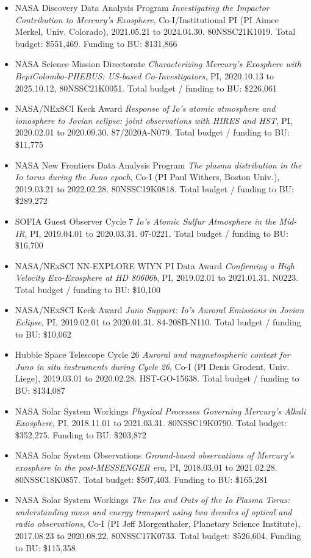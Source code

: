 \documentclass[12pt]{report}
\begin{document}
\begin{itemize}
 \item NASA Discovery Data Analysis Program {\it Investigating the Impactor Contribution to Mercury's Exosphere}, Co-I/Institutional PI (PI Aimee Merkel, Univ. Colorado), 2021.05.21 to 2024.04.30. 80NSSC21K1019. Total budget: \$551,469. Funding to BU: \$131,866
 \item NASA Science Mission Directorate {\it Characterizing Mercury’s Exosphere with BepiColombo-PHEBUS: US-based Co-Investigators}, PI, 2020.10.13 to 2025.10.12, 80NSSC21K0051. Total budget / funding to BU: \$226,061
 \item NASA/NExSCI Keck Award {\it Response of Io's atomic atmosphere and ionosphere to Jovian eclipse: joint observations with HIRES and HST}, PI, 2020.02.01 to 2020.09.30. 87/2020A-N079. Total budget / funding to BU: \$11,775
 \item NASA New Frontiers Data Analysis Program {\it The plasma distribution in the Io torus during the Juno epoch}, Co-I (PI Paul Withers, Boston Univ.), 2019.03.21 to 2022.02.28. 80NSSC19K0818. Total budget / funding to BU: \$289,272
 \item SOFIA Guest Observer Cycle 7 {\it Io's Atomic Sulfur Atmosphere in the Mid-IR}, PI, 2019.04.01 to 2020.03.31. 07-0221. Total budget / funding to BU: \$16,700
 \item NASA/NExSCI NN-EXPLORE WIYN PI Data Award {\it Confirming a High Velocity Exo-Exosphere at HD 80606b}, PI, 2019.02.01 to 2021.01.31. N0223. Total budget / funding to BU: \$10,100
 \item NASA/NExSCI Keck Award {\it Juno Support: Io's Auroral Emissions in Jovian Eclipse}, PI, 2019.02.01 to 2020.01.31. 84-208B-N110. Total budget / funding to BU: \$10,062
 \item Hubble Space Telescope Cycle 26 {\it Auroral and magnetospheric context for Juno in situ instruments during Cycle 26}, Co-I (PI Denis Grodent, Univ. Liege), 2019.03.01 to 2020.02.28. HST-GO-15638. Total budget / funding to BU: \$134,087
 \item NASA Solar System Workings  {\it Physical Processes Governing Mercury's Alkali Exosphere}, PI, 2018.11.01 to 2021.03.31. 80NSSC19K0790. Total budget: \$352,275. Funding to BU: \$203,872
 \item NASA Solar System Observations {\it Ground-based observations of Mercury's exosphere in the post-MESSENGER era}, PI, 2018.03.01 to 2021.02.28. 80NSSC18K0857. Total budget: \$507,403. Funding to BU: \$165,281
 \item NASA Solar System Workings {\it The Ins and Outs of the Io Plasma Torus: understanding mass and energy transport using two decades of optical and radio observations}, Co-I (PI Jeff Morgenthaler, Planetary Science Institute), 2017.08.23 to 2020.08.22. 80NSSC17K0733. Total budget: \$526,604. Funding to BU: \$115,358

\end{itemize}
\end{document}
